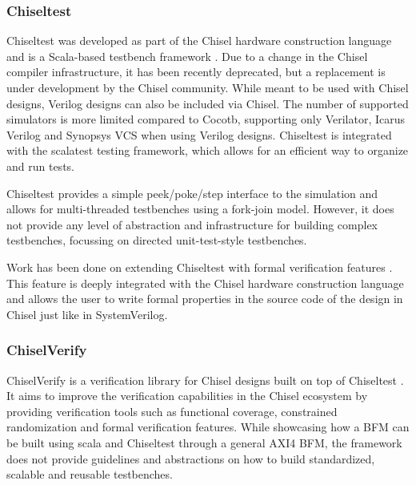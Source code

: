 \subsubsection{Chiseltest} %

Chiseltest was developed as part of the Chisel hardware construction language \cite{chiselpaper} and is a Scala-based testbench
framework \cite{chiseltest}. Due to a change in the Chisel compiler infrastructure, it has been recently deprecated,
but a replacement is under development by the Chisel community. While meant to be used with Chisel designs, Verilog
designs can also be included via Chisel. The number of supported simulators is more limited compared to Cocotb,
supporting only Verilator, Icarus Verilog and Synopsys VCS when using Verilog designs. Chiseltest is integrated with
the scalatest testing framework, which allows for an efficient way to organize and run tests.

Chiseltest provides a simple peek/poke/step interface to the simulation and allows for multi-threaded testbenches
using a fork-join model. However, it does not provide any
level of abstraction and infrastructure for building complex
testbenches, focussing on directed unit-test-style testbenches.

Work has been done on extending Chiseltest with formal verification features \cite{laeufer2021open}. This feature is
deeply integrated with the Chisel hardware construction language and allows the user to write formal properties in
the source code of the design in Chisel just like in SystemVerilog.

\subsubsection{ChiselVerify} %

ChiselVerify is a verification library for Chisel designs built on top of Chiseltest \cite{chiselverify}. It aims to
improve the verification capabilities in the Chisel ecosystem by providing verification tools such as functional
coverage, constrained randomization and formal verification features. While showcasing how a BFM can be built using
scala and Chiseltest through a general AXI4 BFM, the framework does not provide guidelines and abstractions on how to
build standardized, scalable and reusable testbenches.

